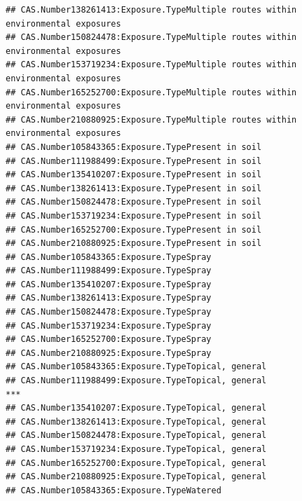 \documentclass[
  12pt,
]{article}
\begin{document}
\begin{verbatim}
## CAS.Number138261413:Exposure.TypeMultiple routes within environmental exposures    
## CAS.Number150824478:Exposure.TypeMultiple routes within environmental exposures    
## CAS.Number153719234:Exposure.TypeMultiple routes within environmental exposures    
## CAS.Number165252700:Exposure.TypeMultiple routes within environmental exposures    
## CAS.Number210880925:Exposure.TypeMultiple routes within environmental exposures    
## CAS.Number105843365:Exposure.TypePresent in soil                                   
## CAS.Number111988499:Exposure.TypePresent in soil                                   
## CAS.Number135410207:Exposure.TypePresent in soil                                   
## CAS.Number138261413:Exposure.TypePresent in soil                                   
## CAS.Number150824478:Exposure.TypePresent in soil                                   
## CAS.Number153719234:Exposure.TypePresent in soil                                   
## CAS.Number165252700:Exposure.TypePresent in soil                                   
## CAS.Number210880925:Exposure.TypePresent in soil                                   
## CAS.Number105843365:Exposure.TypeSpray                                             
## CAS.Number111988499:Exposure.TypeSpray                                             
## CAS.Number135410207:Exposure.TypeSpray                                             
## CAS.Number138261413:Exposure.TypeSpray                                             
## CAS.Number150824478:Exposure.TypeSpray                                             
## CAS.Number153719234:Exposure.TypeSpray                                             
## CAS.Number165252700:Exposure.TypeSpray                                             
## CAS.Number210880925:Exposure.TypeSpray                                             
## CAS.Number105843365:Exposure.TypeTopical, general                                  
## CAS.Number111988499:Exposure.TypeTopical, general                               ***
## CAS.Number135410207:Exposure.TypeTopical, general                                  
## CAS.Number138261413:Exposure.TypeTopical, general                                  
## CAS.Number150824478:Exposure.TypeTopical, general                                  
## CAS.Number153719234:Exposure.TypeTopical, general                                  
## CAS.Number165252700:Exposure.TypeTopical, general                                  
## CAS.Number210880925:Exposure.TypeTopical, general                                  
## CAS.Number105843365:Exposure.TypeWatered                                           

\end{verbatim}
\end{document}

